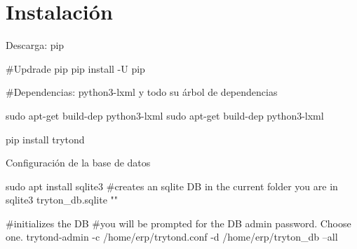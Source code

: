
\section{Instalación}


	\begin{frame}{Descarga: pip}
		\begin{mycode}
#Updrade pip
pip install -U pip

#Dependencias: python3-lxml y todo su árbol de dependencias

sudo apt-get build-dep python3-lxml
sudo apt-get build-dep python3-lxml

pip install trytond
		\end{mycode}
    \end{frame}


	\begin{frame}[fragile=singleslide]{Configuración de la base de datos}

		\begin{mycode}
sudo apt install sqlite3
#creates an sqlite DB in the current folder you are in
sqlite3 tryton_db.sqlite ""

#initializes the DB
#you will be prompted for the DB admin password. Choose one.
trytond-admin -c /home/erp/trytond.conf -d /home/erp/tryton_db --all
		\end{mycode}
	\end{frame}
